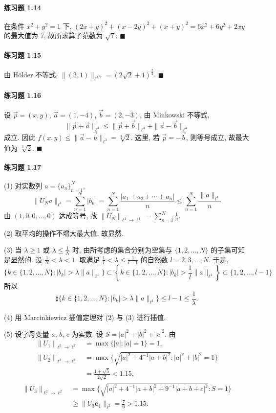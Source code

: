 \paragraph*{练习题 1.14}
在条件 $x^{2}+y^{2} = 1$ 下, $(2x+y)^{2}+(x-2y)^{2}+(x+y)^{2} = 6x^{2}+6y^{2}+2xy$ 的最大值为 7, 故所求算子范数为 $\sqrt{7}$. $\blacksquare$

\paragraph*{练习题 1.15}
由 Hölder 不等式, $\|(2,1)\|_{\ell^{3/2}} = (2\sqrt{2}+1)^{\frac{2}{3}}$. $\blacksquare$

\paragraph*{练习题 1.16}
设 $\vec{p} = (x,y)$, $\vec{a} = (1,-4)$, $\vec{b} = (2,-3)$, 由 Minkowski 不等式,
\[
\|\vec{p}+\vec{a}\|_{\ell^{3}} \leq \|\vec{p}+\vec{b}\|_{\ell^{3}} + \|\vec{a}-\vec{b}\|_{\ell^{3}}
\]
成立. 因此 $f(x,y) \leq \|\vec{a}-\vec{b}\|_{\ell^{3}} = \sqrt[3]{2}$. 这里, 若 $\vec{p} = -\vec{b}$, 则等号成立, 故最大值为 $\sqrt[3]{2}$. $\blacksquare$

\paragraph*{练习题 1.17}
(1) 对实数列 $a = \{a_{n}\}_{n=1}^{N}$,
\[
\|U_{N}a\|_{\ell^{1}} = \sum_{n=1}^{N}|b_{n}| = \sum_{n=1}^{N}\frac{|a_{1}+a_{2}+\cdots+a_{n}|}{n} \leq \sum_{n=1}^{N}\frac{\|a\|_{\ell^{1}}}{n}
\]
由 $(1,0,0,\ldots,0)$ 达成等号, 故 $\|U_{N}\|_{\ell^{1}\to\ell^{1}} = \sum_{n=1}^{N}\frac{1}{n}$.

(2) 取平均的操作不增大最大值, 故显然.

(3) 当 $\lambda \geq 1$ 或 $\lambda \leq \frac{1}{N}$ 时, 由所考虑的集合分别为空集与 $\{1,2,\ldots,N\}$ 的子集可知是显然的. 设 $\frac{1}{N} < \lambda < 1$. 取满足 $\frac{1}{l} < \lambda \leq \frac{1}{l-1}$ 的自然数 $l = 2, 3, \ldots, N$. 于是,
\[
\{k \in \{1, 2, \ldots, N\}: |b_{k}| > \lambda\|a\|_{\ell^{1}}\} \subset \left\{k \in \{1, 2, \ldots, N\}: |b_{k}| > \frac{1}{l}\|a\|_{\ell^{1}}\right\} \subset \{1, 2, \ldots, l-1\}
\]
所以
\[
\sharp\{k \in \{1, 2, \ldots, N\}: |b_{k}| > \lambda\|a\|_{\ell^{1}}\} \leq l-1 \leq \frac{1}{\lambda}.
\]

(4) 用 Marcinkiewicz 插值定理对 (2) 与 (3) 进行插值.

(5) 设字母变量 $a$, $b$, $c$ 为实数. 设 $S = |a|^{2}+|b|^{2}+|c|^{2}$. 由
\begin{align*}
\|U_{1}\|_{\ell^{2}\to\ell^{2}} &= \max\{|a|: |a| = 1\} = 1, \\
\|U_{2}\|_{\ell^{2}\to\ell^{2}} &= \max\{\sqrt{|a|^{2}+4^{-1}|a+b|^{2}}: |a|^{2}+|b|^{2} = 1\} \\
&= \frac{1+\sqrt{5}}{2\sqrt{2}} < 1.15,
\end{align*}
\begin{align*}
\|U_{3}\|_{\ell^{2}\to\ell^{2}} &= \max\{\sqrt{|a|^{2}+4^{-1}|a+b|^{2}+9^{-1}|a+b+c|^{2}}: S = 1\} \\
&\geq \|U_{3}\mathbf{e}_{1}\|_{\ell^{2}} = \frac{7}{6} > 1.15.
\end{align*}

